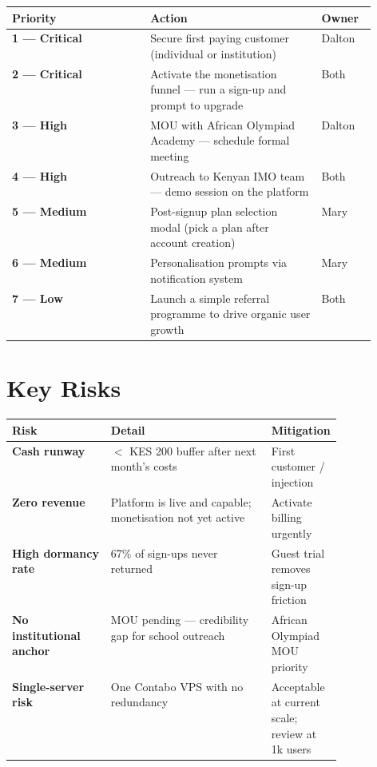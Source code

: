 \documentclass[12pt,a4paper]{article}
\begin{document}
\begin{tabularx}{\linewidth}{>{\bfseries}p{0.38\linewidth} X p{0.15\linewidth}}
\toprule
\textbf{Priority} & \textbf{Action} & \textbf{Owner} \\
\midrule
\rowcolor{rowgray}
1 — Critical & Secure first paying customer (individual or institution) & Dalton \\
2 — Critical & Activate the monetisation funnel — run a sign-up and prompt to upgrade & Both \\
\rowcolor{rowgray}
3 — High & MOU with African Olympiad Academy — schedule formal meeting & Dalton \\
4 — High & Outreach to Kenyan IMO team — demo session on the platform & Both \\
\rowcolor{rowgray}
5 — Medium & Post-signup plan selection modal (pick a plan after account creation) & Mary \\
6 — Medium & Personalisation prompts via notification system & Mary \\
\rowcolor{rowgray}
7 — Low & Launch a simple referral programme to drive organic user growth & Both \\
\bottomrule
\end{tabularx}

\section{Key Risks}

\begin{tabularx}{\linewidth}{>{\bfseries}p{0.3\linewidth} X p{0.18\linewidth}}
\toprule
\textbf{Risk} & \textbf{Detail} & \textbf{Mitigation} \\
\midrule
\rowcolor{rowgray}
Cash runway & $<$ KES 200 buffer after next month's costs & First customer / injection \\
Zero revenue & Platform is live and capable; monetisation not yet active &
  Activate billing urgently \\
\rowcolor{rowgray}
High dormancy rate & 67\% of sign-ups never returned &
  Guest trial removes sign-up friction \\
No institutional anchor & MOU pending — credibility gap for school outreach &
  African Olympiad MOU priority \\
\rowcolor{rowgray}
Single-server risk & One Contabo VPS with no redundancy &
  Acceptable at current scale; review at 1k users \\
\bottomrule
\end{tabularx}
\end{document}
